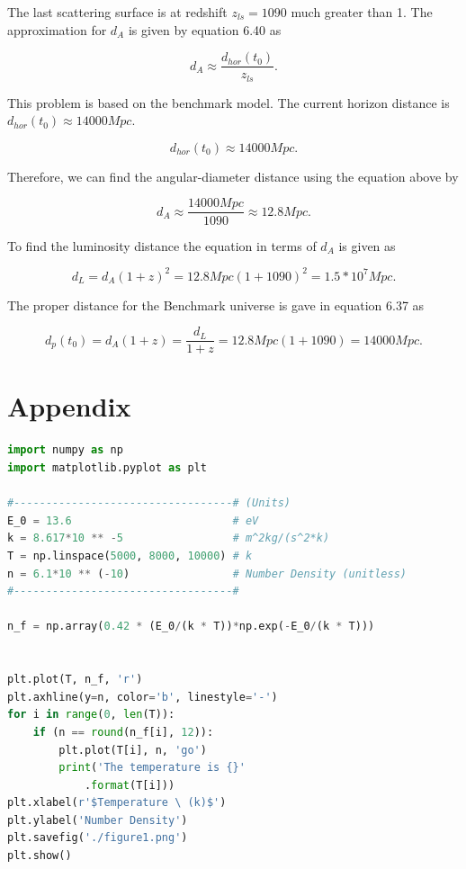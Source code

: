 \documentclass[12pt]{article}
\begin{document}
The last scattering surface is at redshift $z_{ls} = 1090$ much greater than 1. The approximation for $d_{A}$ is given by equation 6.40 as 

$$
d_{A} \approx \frac{d_{hor}(t_{0})}{z_{ls}}.
$$

This problem is based on the benchmark model. The current horizon distance is $d_{hor}(t_{0}) \approx 14000 Mpc$.

$$
d_{hor}(t_{0}) \approx 14000 Mpc.
$$

Therefore, we can find the angular-diameter distance using the equation above by 

$$
d_{A} \approx \frac{14000Mpc}{1090} \approx 12.8 Mpc.
$$

To find the luminosity distance the equation in terms of $d_{A}$ is given as

$$
d_{L} = d_{A}(1 + z)^{2} = 12.8 Mpc (1 + 1090)^{2} = 1.5*10^{7}Mpc.
$$

The proper distance for the Benchmark universe is gave in equation 6.37 as

$$
d_{p}(t_{0}) = d_{A}(1 + z) = \frac{d_{L}}{1 + z} = 12.8Mpc(1 + 1090) = 14000Mpc.
$$


\section*{Appendix}

\begin{lstlisting}[language=Python, caption= Problem 8.2 plotting code]
import numpy as np
import matplotlib.pyplot as plt

#----------------------------------# (Units)
E_0 = 13.6                         # eV
k = 8.617*10 ** -5                 # m^2kg/(s^2*k)
T = np.linspace(5000, 8000, 10000) # k
n = 6.1*10 ** (-10)                # Number Density (unitless)
#----------------------------------#

n_f = np.array(0.42 * (E_0/(k * T))*np.exp(-E_0/(k * T)))


plt.plot(T, n_f, 'r')
plt.axhline(y=n, color='b', linestyle='-')
for i in range(0, len(T)):
    if (n == round(n_f[i], 12)):
        plt.plot(T[i], n, 'go')
        print('The temperature is {}'
            .format(T[i]))
plt.xlabel(r'$Temperature \ (k)$')
plt.ylabel('Number Density')
plt.savefig('./figure1.png')
plt.show()
\end{lstlisting}


 
\end{document}
